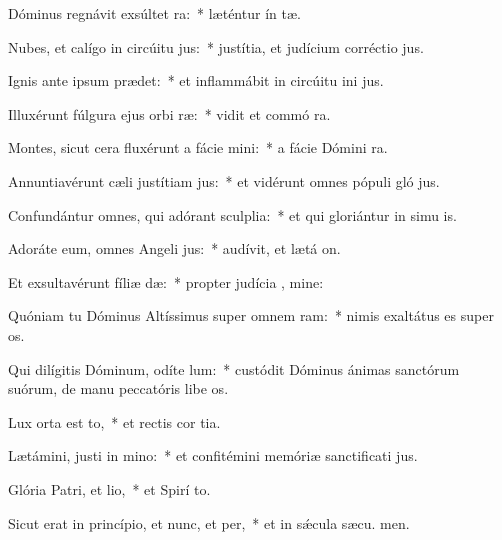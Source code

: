 \item Dóminus regnávit exsúltet ra:~* læténtur ín tæ.
\item Nubes, et calígo in circúitu jus:~* justítia, et judícium corréctio  jus.
\item Ignis ante ipsum prædet:~* et inflammábit in circúitu ini jus.
\item Illuxérunt fúlgura ejus orbi ræ:~* vidit et commó  ra.
\item Montes, sicut cera fluxérunt a fácie mini:~* a fácie Dómini  ra.
\item Annuntiavérunt cæli justítiam jus:~* et vidérunt omnes pópuli gló jus.
\item Confundántur omnes, qui adórant sculplia:~* et qui gloriántur in simu is.
\item Adoráte eum, omnes Angeli jus:~* audívit, et lætá  on.
\item Et exsultavérunt fíliæ dæ:~* propter judícia , mine:
\item Quóniam tu Dóminus Altíssimus super omnem ram:~* nimis exaltátus es super  os.
\item Qui dilígitis Dóminum, odíte lum:~* custódit Dóminus ánimas sanctórum suórum, de manu peccatóris libe os.
\item Lux orta est to,~* et rectis cor tia.
\item Lætámini, justi in mino:~* et confitémini memóriæ sanctificati jus.
\item Glória Patri, et lio,~* et Spirí to.
\item Sicut erat in princípio, et nunc, et per,~* et in sǽcula sæcu. men.
